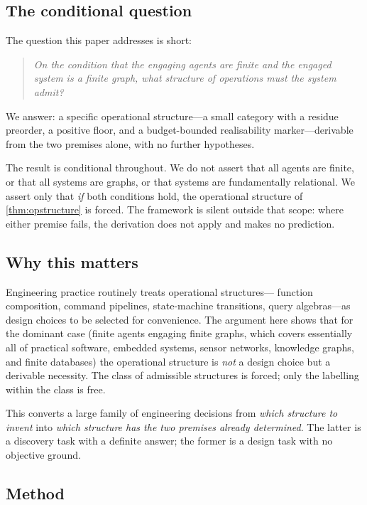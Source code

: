 \documentclass[11pt,twocolumn,a4paper]{article}
\theoremstyle{thmstyle}
\theoremstyle{definition}
\theoremstyle{remark}
\begin{document}
\subsection{The conditional question}

The question this paper addresses is short:
\begin{quote}\itshape
On the condition that the engaging agents are finite and the engaged
system is a finite graph, what structure of operations must the
system admit?
\end{quote}
We answer: a specific operational structure---a small category
with a residue preorder, a positive floor, and a budget-bounded
realisability marker---derivable from the two premises alone, with
no further hypotheses.

The result is conditional throughout. We do not assert that all
agents are finite, or that all systems are graphs, or that systems
are fundamentally relational. We assert only that \emph{if} both
conditions hold, the operational structure of
\cref{thm:opstructure} is forced. The framework is silent outside
that scope: where either premise fails, the derivation does not
apply and makes no prediction.

\subsection{Why this matters}

Engineering practice routinely treats operational structures---
function composition, command pipelines, state-machine transitions,
query algebras---as design choices to be selected for convenience.
The argument here shows that for the dominant case (finite agents
engaging finite graphs, which covers essentially all of practical
software, embedded systems, sensor networks, knowledge graphs, and
finite databases) the operational structure is \emph{not} a design
choice but a derivable necessity. The class of admissible structures
is forced; only the labelling within the class is free.

This converts a large family of engineering decisions from
\emph{which structure to invent} into \emph{which structure has the
two premises already determined}. The latter is a discovery task
with a definite answer; the former is a design task with no
objective ground.

\subsection{Method}
\end{document}
